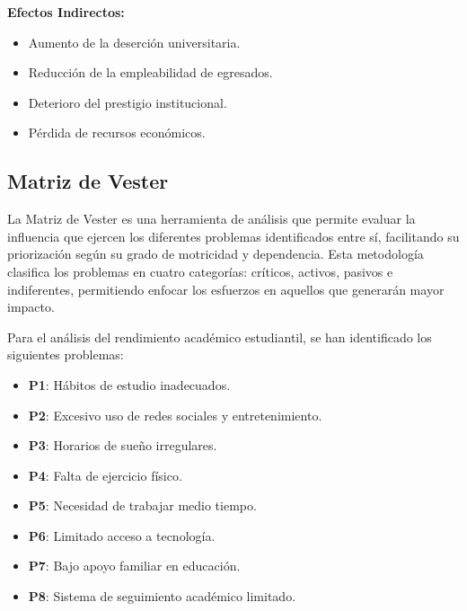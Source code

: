 \documentclass[12pt,letterpaper]{report}
\begin{document}
\textbf{Efectos Indirectos:}
\vspace{0.1cm}
\begin{itemize}
    \item Aumento de la deserción universitaria.
    \item Reducción de la empleabilidad de egresados.
    \item Deterioro del prestigio institucional.
    \item Pérdida de recursos económicos.
\end{itemize}

\subsection{Matriz de Vester}

La Matriz de Vester es una herramienta de análisis que permite evaluar la influencia que ejercen los diferentes problemas identificados entre sí, facilitando su priorización según su grado de motricidad y dependencia. Esta metodología clasifica los problemas en cuatro categorías: críticos, activos, pasivos e indiferentes, permitiendo enfocar los esfuerzos en aquellos que generarán mayor impacto.

Para el análisis del rendimiento académico estudiantil, se han identificado los siguientes problemas:

\begin{itemize}
    \item \textbf{P1}: Hábitos de estudio inadecuados.
    \item \textbf{P2}: Excesivo uso de redes sociales y entretenimiento.
    \item \textbf{P3}: Horarios de sueño irregulares.
    \item \textbf{P4}: Falta de ejercicio físico.
    \item \textbf{P5}: Necesidad de trabajar medio tiempo.
    \item \textbf{P6}: Limitado acceso a tecnología.
    \item \textbf{P7}: Bajo apoyo familiar en educación.
    \item \textbf{P8}: Sistema de seguimiento académico limitado.
\end{itemize}
\end{document}
